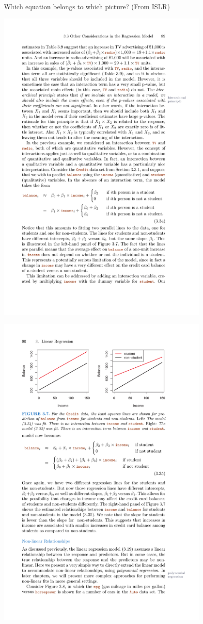 \documentclass[aspectratio=169]{beamer}
\begin{document}
\begin{frame}{Which equation belongs to which picture? (From ISLR)}

\vspace{3mm}
\includegraphics[width=0.8\textwidth]{CreditEqn1}

\includegraphics[width=0.8\textwidth]{CreditEqn2}


\end{frame}
\end{document}
